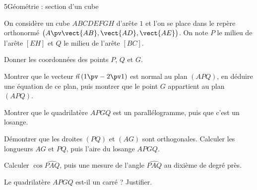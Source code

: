 \begin{exoBac}{5}{Géométrie : section d'un cube}
\begin{codecote}[0.6]
On considère un cube $ABCDEFGH$ d'arête $1$ et l'on se place dans le repère orthonormé $\big(A\pv\vect{AB},\vect{AD},\vect{AE}\big)$. On note
$P$ le milieu de l'arête $[EH]$ et $Q$ le milieu de l'arête $[BC]$.
\begin{questions}
  \item Donner les coordonnées des points $P$, $Q$ et $G$.
  \item Montrer que le vecteur $\vec n\,(1\pv-2\pv1)$ est normal au plan $(APQ)$, en déduire une équation de ce plan, puis montrer que le
    point $G$ appartient au plan $(APQ)$.
\end{questions}
\cote
\centering
{}
\end{codecote}
\begin{questions}[start=3]
  \item Montrer que le quadrilatère $APGQ$ est un parallélogramme, puis que c'est un losange.
  \item Démontrer que les droites $(PQ)$ et $(AG)$ sont orthogonales. Calculer les longueurs $AG$ et $PQ$, puis l'aire du losange $APGQ$.
  \item Calculer $\cos\widehat{PAQ}$, puis une mesure de l'angle $\widehat{PAQ}$ au dixième de degré près.
  \item Le quadrilatère $APGQ$ est-il un carré ? Justifier.
\end{questions}
\end{exoBac}

